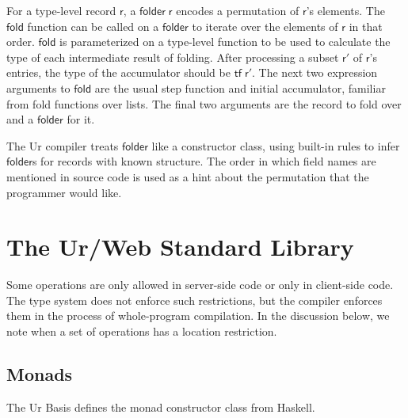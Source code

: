 \documentclass{article}
\newcommand{\mt}[1]{\mathsf{#1}}
\begin{document}
For a type-level record $\mt{r}$, a $\mt{folder} \; \mt{r}$ encodes a permutation of $\mt{r}$'s elements.  The $\mt{fold}$ function can be called on a $\mt{folder}$ to iterate over the elements of $\mt{r}$ in that order.  $\mt{fold}$ is parameterized on a type-level function to be used to calculate the type of each intermediate result of folding.  After processing a subset $\mt{r'}$ of $\mt{r}$'s entries, the type of the accumulator should be $\mt{tf} \; \mt{r'}$.  The next two expression arguments to $\mt{fold}$ are the usual step function and initial accumulator, familiar from fold functions over lists.  The final two arguments are the record to fold over and a $\mt{folder}$ for it.

The Ur compiler treats $\mt{folder}$ like a constructor class, using built-in rules to infer $\mt{folder}$s for records with known structure.  The order in which field names are mentioned in source code is used as a hint about the permutation that the programmer would like.


\section{The Ur/Web Standard Library}

Some operations are only allowed in server-side code or only in client-side code.  The type system does not enforce such restrictions, but the compiler enforces them in the process of whole-program compilation.  In the discussion below, we note when a set of operations has a location restriction.

\subsection{Monads}

The Ur Basis defines the monad constructor class from Haskell.
\end{document}
